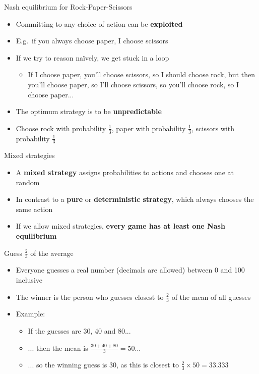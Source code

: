 \begin{frame}{Nash equilibrium for Rock-Paper-Scissors}
	\begin{itemize}
		\pause\item Committing to any choice of action can be \textbf{exploited}
		\pause\item E.g.\ if you always choose paper, I choose scissors
		\pause\item If we try to reason na\"ively, we get stuck in a loop
			\begin{itemize}
				\pause\item If I choose paper, you'll choose scissors, so I should choose rock, but then you'll choose paper,
					so I'll choose scissors, so you'll choose rock, so I choose paper...
			\end{itemize}
		\pause\item The optimum strategy is to be \textbf{unpredictable}
		\pause\item Choose rock with probability $\frac13$, paper with probability $\frac13$,
			scissors with probability $\frac13$
	\end{itemize}
\end{frame}

\begin{frame}{Mixed strategies}
	\begin{itemize}
		\pause\item A \textbf{mixed strategy} assigns probabilities to actions and chooses one at random
		\pause\item In contrast to a \textbf{pure} or \textbf{deterministic strategy}, which always chooses the same action
		\pause\item If we allow mixed strategies, \textbf{every game has at least one Nash equilibrium}
	\end{itemize}
\end{frame}

\begin{frame}{Guess $\frac23$ of the average}
	\begin{itemize}
		\pause\item Everyone guesses a real number (decimals are allowed) between 0 and 100 inclusive
		\pause\item The winner is the person who guesses closest to $\frac23$ of the mean of all guesses
		\pause\item Example:
			\begin{itemize}
				\pause\item If the guesses are 30, 40 and 80...
				\pause\item ... then the mean is $\frac{30+40+80}{3} = 50$...
				\pause\item ... so the winning guess is 30, as this is closest to $\frac23 \times 50 = 33.333$
			\end{itemize}
	\end{itemize}
\end{frame}

